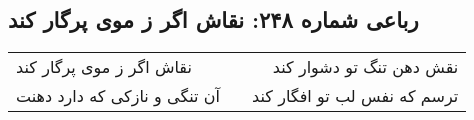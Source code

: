 \begin{center}
\section*{رباعی شماره ۲۴۸: نقاش اگر ز موی پرگار کند}
\label{sec:sh248}
\begin{longtable}{l p{0.5cm} r}
نقاش اگر ز موی پرگار کند
&&
نقش دهن تنگ تو دشوار کند
\\
آن تنگی و نازکی که دارد دهنت
&&
ترسم که نفس لب تو افگار کند
\\
\end{longtable}
\end{center}
